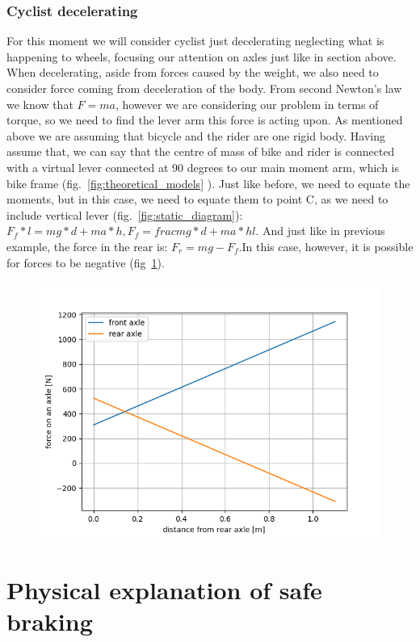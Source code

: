 \documentclass[12pt]{article}
\begin{document}
\subsubsection{Cyclist decelerating}
For this moment we will consider cyclist just decelerating neglecting what is happening to wheels, focusing
our attention on axles just like in section above. When decelerating, aside from forces caused by the weight, 
we also need to consider force coming from deceleration of the body. From second Newton's law we know that 
$F = ma$, however we are considering our problem in terms of torque, so we need to find the lever arm this
force is acting upon. As mentioned above we are assuming that bicycle and the rider are one rigid body. 
Having assume that, we can say that the centre of mass of bike and rider is connected with a virtual lever
connected at 90 degrees to our main moment arm, which is bike frame (fig.~\ref{fig:theoretical_models}
). Just like before, we need to equate the moments, but in this case, we need to 
equate them to point C, as we need to include vertical lever (fig.~\ref{fig:static_diagram}): 
$F_f * l = mg * d + ma * h, F_f = frac{mg * d + ma * h}{l}$. And just like in previous example, 
the force in the rear is: $F_r = mg - F_f$.In this case, however, it is possible for forces to be 
negative (fig~\ref{fig:dynamic_graph}).
\begin{figure}[H]
\caption{}
\includegraphics[width=\linewidth]{axles_dynamic_graph}%
\label{fig:dynamic_graph}
\end{figure}

\section{Physical explanation of safe braking}
\end{document}
